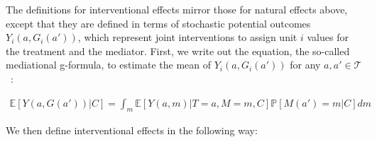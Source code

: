 The definitions for interventional effects mirror those for natural effects above, except that they are
defined in terms of stochastic potential outcomes $Y_{i}(a,G_{i}(a'))$, which represent joint interventions
to assign unit $i$ values for the treatment and the mediator. First, we write out the equation, the so-called 
mediational g-formula, to estimate the mean of $Y_{i}(a,G_{i}(a'))$ for any 
$a, a' \in \mathcal{T}$~\citep{kuhaetal2021}: 

\begin{equation}\label{eq:RIE_one_mediator_g_comp}
\begin{aligned}
	\mathbb{E}[Y(a,G(a'))|C] = 
	\int_{m} \mathbb{E}[Y(a,m)|T = a, M = m, C]\mathbb{P}[M(a') = m|C]dm
\end{aligned}
\end{equation}

We then define interventional effects in the following way: 

